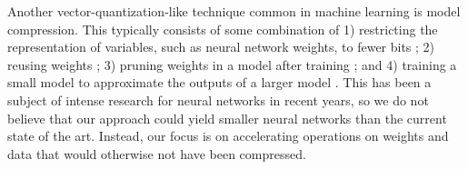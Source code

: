 Another vector-quantization-like technique common in machine learning is model compression. This typically consists of some combination of 1) restricting the representation of variables, such as neural network weights, to fewer bits \cite{lossAwareDnnBinarization}; 2) reusing weights \cite{hashnet}; 3) pruning weights in a model after training \cite{diversityNets, learningWeightsConnections}; and 4) training a small model to approximate the outputs of a larger model \cite{rnnDarkKnowledge}. This has been a subject of intense research for neural networks in recent years, so we do not believe that our approach could yield smaller neural networks than the current state of the art. Instead, our focus is on accelerating operations on weights and data that would otherwise not have been compressed.%









